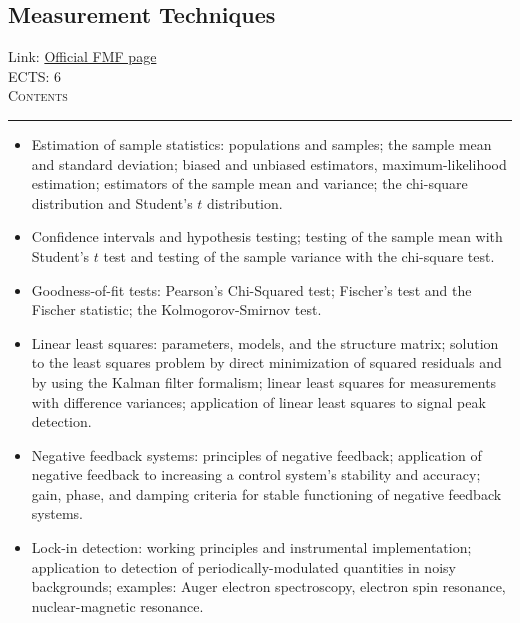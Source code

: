 \documentclass[11pt, a4paper]{article}
\newenvironment{course}[3]{
\subsection{#1}%
Link: \href{#2}{Official FMF page}\\%
ECTS: #3%
\vspace{1ex}
\\
{\large \textsc{Contents}}\\[-0.9ex]%
\rule{\textwidth}{0.5pt}
\vspace{-3ex}
}
{}
\newenvironment{chapter}[1]{
\begin{tcolorbox}[title=#1, breakable]
}
{\end{tcolorbox}}
\begin{document}
\begin{course}{Measurement Techniques}{https://www.fmf.uni-lj.si/en/study-physics/programmes/1fiz/2020/7000777/courses/1441/}{6}
\begin{chapter}{Analysis of sensors and filters}
\begin{itemize}
        \end{itemize}
    \end{chapter}

    \begin{chapter}{Statistics}
        \begin{itemize}
        
            \item Estimation of sample statistics: populations and samples; the sample mean and standard deviation; biased and unbiased estimators, maximum-likelihood estimation; estimators of the sample mean and variance; the chi-square distribution and Student's $ t $ distribution.

            \item Confidence intervals and hypothesis testing; testing of the sample mean with Student's $ t $ test and testing of the sample variance with the chi-square test.

            \item Goodness-of-fit tests: Pearson's Chi-Squared test; Fischer's test and the Fischer statistic; the Kolmogorov-Smirnov test.

            \item Linear least squares: parameters, models, and the structure matrix; solution to the least squares problem by direct minimization of squared residuals and by using the Kalman filter formalism; linear least squares for measurements with difference variances; application of linear least squares to signal peak detection.
        
        \end{itemize}
    \end{chapter}

    \begin{chapter}{Important measurement techniques}
        \begin{itemize}
        
            \item Negative feedback systems: principles of negative feedback; application of negative feedback to increasing a control system's stability and accuracy; gain, phase, and damping criteria for stable functioning of negative feedback systems.

            \item Lock-in detection: working principles and instrumental implementation; application to detection of periodically-modulated quantities in noisy backgrounds; examples: Auger electron spectroscopy, electron spin resonance, nuclear-magnetic resonance.


\end{itemize}
\end{chapter}
\end{course}
\end{document}
